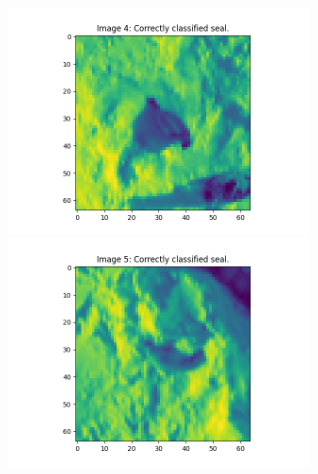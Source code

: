 \documentclass[12pt, letterpaper]{article}
\begin{document}
\begin{figure}[H]
        \includegraphics[width=8cm]{corr4}
        \includegraphics[width=8cm]{corr5}
      \end{figure}\\
\end{document}
